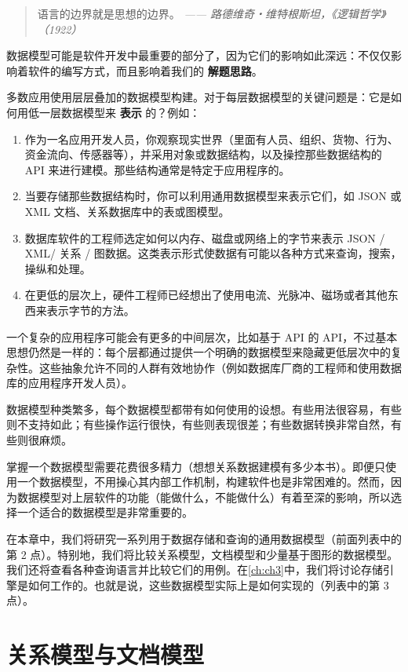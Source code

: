 \begin{quote}
    语言的边界就是思想的边界。
    \textit{—— 路德维奇・维特根斯坦，《逻辑哲学》（1922）}
\end{quote}

数据模型可能是软件开发中最重要的部分了，因为它们的影响如此深远：不仅仅影响着软件的编写方式，而且影响着我们的 \textbf{解题思路}。

多数应用使用层层叠加的数据模型构建。对于每层数据模型的关键问题是：它是如何用低一层数据模型来 \textbf{表示} 的？例如：

\begin{enumerate}
    \item 作为一名应用开发人员，你观察现实世界（里面有人员、组织、货物、行为、资金流向、传感器等），并采用对象或数据结构，以及操控那些数据结构的 API 来进行建模。那些结构通常是特定于应用程序的。
    \item 当要存储那些数据结构时，你可以利用通用数据模型来表示它们，如 JSON 或 XML 文档、关系数据库中的表或图模型。
    \item 数据库软件的工程师选定如何以内存、磁盘或网络上的字节来表示 JSON / XML/ 关系 / 图数据。这类表示形式使数据有可能以各种方式来查询，搜索，操纵和处理。
    \item 在更低的层次上，硬件工程师已经想出了使用电流、光脉冲、磁场或者其他东西来表示字节的方法。
\end{enumerate}

一个复杂的应用程序可能会有更多的中间层次，比如基于 API 的 API，不过基本思想仍然是一样的：每个层都通过提供一个明确的数据模型来隐藏更低层次中的复杂性。这些抽象允许不同的人群有效地协作（例如数据库厂商的工程师和使用数据库的应用程序开发人员）。

数据模型种类繁多，每个数据模型都带有如何使用的设想。有些用法很容易，有些则不支持如此；有些操作运行很快，有些则表现很差；有些数据转换非常自然，有些则很麻烦。

掌握一个数据模型需要花费很多精力（想想关系数据建模有多少本书）。即便只使用一个数据模型，不用操心其内部工作机制，构建软件也是非常困难的。然而，因为数据模型对上层软件的功能（能做什么，不能做什么）有着至深的影响，所以选择一个适合的数据模型是非常重要的。

在本章中，我们将研究一系列用于数据存储和查询的通用数据模型（前面列表中的第 2 点）。特别地，我们将比较关系模型，文档模型和少量基于图形的数据模型。我们还将查看各种查询语言并比较它们的用例。在\autoref{ch:ch3}中，我们将讨论存储引擎是如何工作的。也就是说，这些数据模型实际上是如何实现的（列表中的第 3 点）。

\section{关系模型与文档模型}

